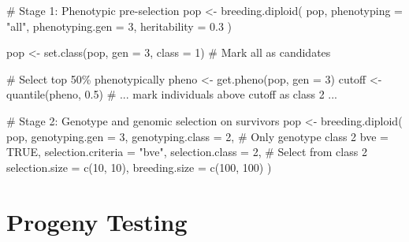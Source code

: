 \documentclass[
  letterpaper,
]{book}
\newenvironment{Shaded}{\begin{snugshade}}{\end{snugshade}}
\newcommand{\AttributeTok}[1]{\textcolor[rgb]{0.40,0.45,0.13}{#1}}
\newcommand{\CommentTok}[1]{\textcolor[rgb]{0.37,0.37,0.37}{#1}}
\newcommand{\ConstantTok}[1]{\textcolor[rgb]{0.56,0.35,0.01}{#1}}
\newcommand{\DecValTok}[1]{\textcolor[rgb]{0.68,0.00,0.00}{#1}}
\newcommand{\FloatTok}[1]{\textcolor[rgb]{0.68,0.00,0.00}{#1}}
\newcommand{\FunctionTok}[1]{\textcolor[rgb]{0.28,0.35,0.67}{#1}}
\newcommand{\NormalTok}[1]{\textcolor[rgb]{0.00,0.23,0.31}{#1}}
\newcommand{\OtherTok}[1]{\textcolor[rgb]{0.00,0.23,0.31}{#1}}
\newcommand{\StringTok}[1]{\textcolor[rgb]{0.13,0.47,0.30}{#1}}
\begin{document}
\begin{Shaded}
\begin{Highlighting}[]
\CommentTok{\# Stage 1: Phenotypic pre{-}selection}
\NormalTok{pop }\OtherTok{\textless{}{-}} \FunctionTok{breeding.diploid}\NormalTok{(}
\NormalTok{  pop,}
  \AttributeTok{phenotyping =} \StringTok{"all"}\NormalTok{,}
  \AttributeTok{phenotyping.gen =} \DecValTok{3}\NormalTok{,}
  \AttributeTok{heritability =} \FloatTok{0.3}
\NormalTok{)}

\NormalTok{pop }\OtherTok{\textless{}{-}} \FunctionTok{set.class}\NormalTok{(pop, }\AttributeTok{gen =} \DecValTok{3}\NormalTok{, }\AttributeTok{class =} \DecValTok{1}\NormalTok{)  }\CommentTok{\# Mark all as candidates}

\CommentTok{\# Select top 50\% phenotypically}
\NormalTok{pheno }\OtherTok{\textless{}{-}} \FunctionTok{get.pheno}\NormalTok{(pop, }\AttributeTok{gen =} \DecValTok{3}\NormalTok{)}
\NormalTok{cutoff }\OtherTok{\textless{}{-}} \FunctionTok{quantile}\NormalTok{(pheno, }\FloatTok{0.5}\NormalTok{)}
\CommentTok{\# ... mark individuals above cutoff as class 2 ...}

\CommentTok{\# Stage 2: Genotype and genomic selection on survivors}
\NormalTok{pop }\OtherTok{\textless{}{-}} \FunctionTok{breeding.diploid}\NormalTok{(}
\NormalTok{  pop,}
  \AttributeTok{genotyping.gen =} \DecValTok{3}\NormalTok{,}
  \AttributeTok{genotyping.class =} \DecValTok{2}\NormalTok{,     }\CommentTok{\# Only genotype class 2}
  \AttributeTok{bve =} \ConstantTok{TRUE}\NormalTok{,}
  \AttributeTok{selection.criteria =} \StringTok{"bve"}\NormalTok{,}
  \AttributeTok{selection.class =} \DecValTok{2}\NormalTok{,       }\CommentTok{\# Select from class 2}
  \AttributeTok{selection.size =} \FunctionTok{c}\NormalTok{(}\DecValTok{10}\NormalTok{, }\DecValTok{10}\NormalTok{),}
  \AttributeTok{breeding.size =} \FunctionTok{c}\NormalTok{(}\DecValTok{100}\NormalTok{, }\DecValTok{100}\NormalTok{)}
\NormalTok{)}
\end{Highlighting}
\end{Shaded}

\section{Progeny Testing}\label{progeny-testing}
\end{document}

